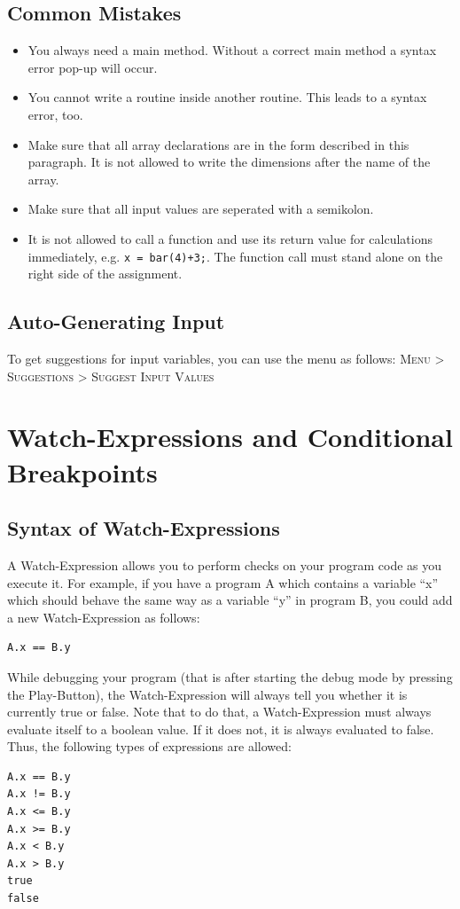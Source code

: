 \documentclass[parskip=full]{memoir}
\begin{document}
\section{Common Mistakes}
\begin{itemize}
\item You always need a main method. Without a correct main method a syntax error pop-up will occur.
\item You cannot write a routine inside another routine. This leads to a syntax error, too.
\item Make sure that all array declarations are in the form described in this paragraph. It is not allowed to write the dimensions after the name of the array.
\item Make sure that all input values are seperated with a semikolon.  
\item It is not allowed to call a function and use its return value for calculations immediately, e.g. \texttt{x = bar(4)+3;}. The function call must stand alone on the right side of the assignment. 
\end{itemize}

\section{Auto-Generating Input}
To get suggestions for input variables, you can use the menu as follows:
\textsc{Menu > Suggestions > Suggest Input Values}


\chapter{Watch-Expressions and Conditional Breakpoints}
\section{Syntax of Watch-Expressions}
A Watch-Expression allows you to perform checks on your program code as you execute it.
For example, if you have a program A which contains a variable \enquote{x} which should behave the same way as a variable \enquote{y} in program B, you could add a new Watch-Expression as follows:
\begin{verbatim}
A.x == B.y
\end{verbatim}

While debugging your program (that is after starting the debug mode by pressing the Play-Button), the Watch-Expression will always tell you whether it is currently true or false.
Note that to do that, a Watch-Expression must always evaluate itself to a boolean value. If it does not, it is always evaluated to false.
Thus, the following types of expressions are allowed:
\begin{verbatim}
A.x == B.y
A.x != B.y
A.x <= B.y
A.x >= B.y
A.x < B.y
A.x > B.y
true
false
\end{verbatim}
\end{document}
